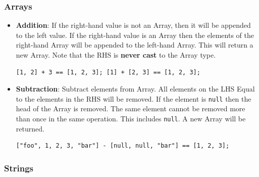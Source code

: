 \documentclass[]{full}
\theoremstyle{definition}
\begin{document}
\subsubsection{Arrays}

\begin{itemize}
    \item \textbf{Addition}: If the right-hand value is not an Array, then it will be appended to the left value. If the right-hand value is an Array then the elements of the right-hand Array will be appended to the left-hand Array. This will return a new Array. Note that the RHS is \textbf{never cast} to the Array type.
    \begin{verbatim}
[1, 2] + 3 == [1, 2, 3]; [1] + [2, 3] == [1, 2, 3];
    \end{verbatim}
    \item \textbf{Subtraction}: Subtract elements from Array. All elements on the LHS Equal to the elements in the RHS will be removed. If the element is \verb|null| then the head of the Array is removed. The same element cannot be removed more than once in the same operation. This includes \verb|null|. A new Array will be returned.
    \begin{verbatim}
["foo", 1, 2, 3, "bar"] - [null, null, "bar"] == [1, 2, 3];
    \end{verbatim}
\end{itemize}

\subsubsection{Strings}
\end{document}
